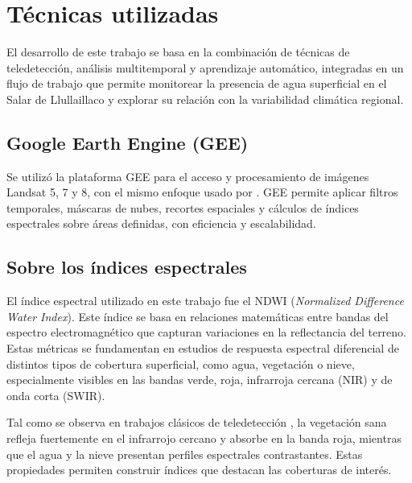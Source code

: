 
\section{Técnicas utilizadas}

El desarrollo de este trabajo se basa en la combinación de técnicas de teledetección, análisis multitemporal y aprendizaje automático, integradas en un flujo de trabajo que permite monitorear la presencia de agua superficial en el Salar de Llullaillaco y explorar su relación con la variabilidad climática regional.

\subsection*{Google Earth Engine (GEE)}

Se utilizó la plataforma GEE para el acceso y procesamiento de imágenes Landsat 5, 7 y 8, con el mismo enfoque usado por \cite{ferran2024ceia, roldan2023ceia}. GEE permite aplicar filtros temporales, máscaras de nubes, recortes espaciales y cálculos de índices espectrales sobre áreas definidas, con eficiencia y escalabilidad.


\subsection*{Sobre los índices espectrales}

El índice espectral utilizado en este trabajo fue el NDWI (\textit{Normalized Difference Water Index}). Este índice se basa en relaciones matemáticas entre bandas del espectro electromagnético que capturan variaciones en la reflectancia del terreno. Estas métricas se fundamentan en estudios de respuesta espectral diferencial de distintos tipos de cobertura superficial, como agua, vegetación o nieve, especialmente visibles en las bandas verde, roja, infrarroja cercana (NIR) y de onda corta (SWIR).

Tal como se observa en trabajos clásicos de teledetección \cite{tucker1979red, huete1988soil}, la vegetación sana refleja fuertemente en el infrarrojo cercano y absorbe en la banda roja, mientras que el agua y la nieve presentan perfiles espectrales contrastantes. Estas propiedades permiten construir índices que destacan las coberturas de interés.


